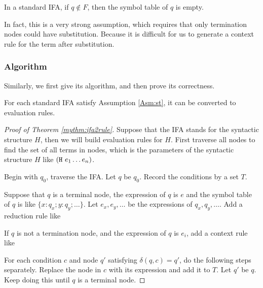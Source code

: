 \begin{Asm}
\label{Asm:st}
In a standard IFA, if $q \notin F$, then the symbol table of $q$ is empty.
\end{Asm}

In fact, this is a very strong assumption, which requires that only termination nodes could have substitution. Because it is difficult for us to generate a context rule for the term after substitution. 

\subsubsection{Algorithm}

Similarly, we first give its algorithm, and then prove its correctness.

\begin{mythm}
\label{mythm:ifa2rule}
For each standard IFA satisfy Assumption \ref{Asm:st}, it can be converted to evaluation rules.
\end{mythm}

\begin{proof}[Proof of Theorem \ref{mythm:ifa2rule}]

Suppose that the IFA stands for the syntactic structure $H$, then we will build evaluation rules for $H$. First traverse all nodes to find the set of all terms in nodes, which is the parameters of the syntactic structure $H$ like $(\mbox{\tt H}~e_1 \ldots e_n)$.

Begin with $q_0$, traverse the IFA. Let $q$ be $q_0$. Record the conditions by a set $T$.

Suppose that $q$ is a terminal node, the expression of $q$ is $e$ and the symbol table of $q$ is like $\{x:q_x; y:q_y; \ldots\}$. Let $e_x,e_y,\ldots$ be the expressions of $q_x, q_y, \ldots$. Add a reduction rule like


If $q$ is not a termination node, and the expression of $q$ is $e_i$, add a context rule like


For each condition $c$ and node $q'$ satisfying $\delta(q, c)=q'$, do the following steps separately. Replace the node in $c$ with its expression and add it to $T$. Let $q'$ be $q$. Keep doing this until $q$ is a terminal node.

\end{proof}

